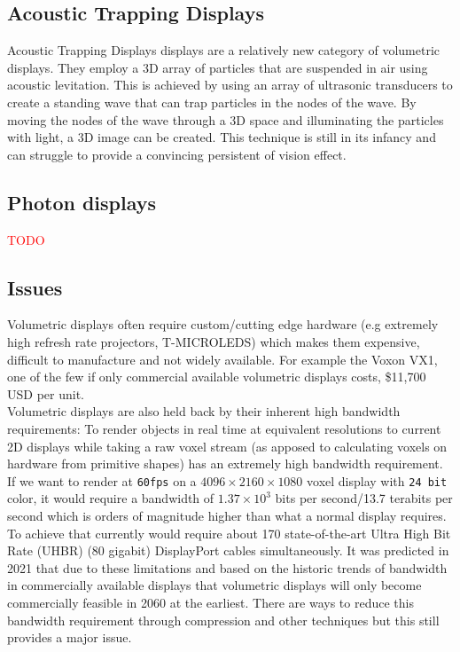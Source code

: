 \subsection{Acoustic Trapping Displays}
Acoustic Trapping Displays displays are a relatively new category of volumetric displays. They employ a 3D array of particles that are suspended in air using acoustic levitation. \cite{10.1063/1.5113467} \cite{Hirayama2019} This is achieved by using an array of ultrasonic transducers to create a standing wave that can trap particles in the nodes of the wave. By moving the nodes of the wave through a 3D space and illuminating the particles with light, a 3D image can be created. This technique is still in its infancy and can struggle to provide a convincing persistent of vision effect. 

\subsection{Photon displays}
\cite{Hirayama2015}
{\textcolor{red}{TODO}}

\subsection{Issues}

Volumetric displays often require custom/cutting edge hardware (e.g extremely high refresh rate projectors, T-MICROLEDS) which makes them expensive, difficult to manufacture and not widely available. For example the Voxon VX1, one of the few if only commercial available volumetric displays costs, \$11,700 USD \cite{noauthor_products_nodate} per unit. \\

Volumetric displays are also held back by their inherent high bandwidth requirements: To render objects in real time at equivalent resolutions to current 2D displays while taking a raw voxel stream (as apposed to calculating voxels on hardware from primitive shapes) has an extremely high bandwidth requirement. If we want to render at \texttt{60fps} on a $4096 \times 2160 \times 1080$ voxel display with \texttt{24 bit} color, it would require a bandwidth of $1.37 \times 10^3$ bits per second/13.7 terabits per second which is orders of magnitude higher than what a normal display requires. To achieve that currently would require about 170 state-of-the-art Ultra High Bit Rate (UHBR) (80 gigabit) DisplayPort cables simultaneously. It was predicted in 2021 \cite{LAM2021050011} that due to these limitations and based on the historic trends of bandwidth in commercially available displays that volumetric displays will only become commercially feasible in 2060 at the earliest. There are ways to reduce this bandwidth requirement through compression and other techniques \tocite but this still provides a major issue. \\

